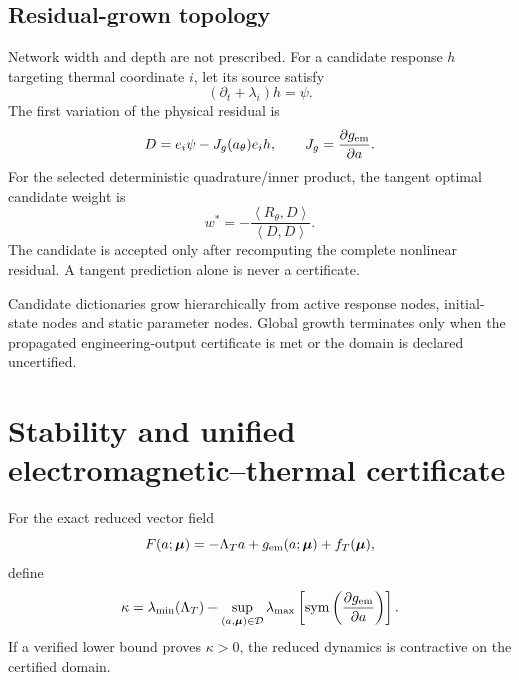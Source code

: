\documentclass[11pt]{article}
\theoremstyle{remark}
\newcommand{\mupar}{\boldsymbol\mu}
\newcommand{\ip}[2]{\left\langle #1,#2\right\rangle}
\newcommand{\sym}{\operatorname{sym}}
\begin{document}
\subsection{Residual-grown topology}
Network width and depth are not prescribed. For a candidate response \(h\) targeting thermal coordinate \(i\), let its source satisfy
\[
(\partial_t+\lambda_i)h=\psi.
\]
The first variation of the physical residual is
\begin{equation}
D=e_i\psi-J_g(a_\theta)e_i h,
\qquad
J_g=\frac{\partial g_{\rm em}}{\partial a}.
\label{eq:candidate_direction}
\end{equation}
For the selected deterministic quadrature/inner product, the tangent optimal candidate weight is
\begin{equation}
\boxed{
w^*=-\frac{\ip{R_\theta}{D}}{\ip{D}{D}}.
}
\label{eq:candidate_weight}
\end{equation}
The candidate is accepted only after recomputing the complete nonlinear residual. A tangent prediction alone is never a certificate.

Candidate dictionaries grow hierarchically from active response nodes, initial-state nodes and static parameter nodes. Global growth terminates only when the propagated engineering-output certificate is met or the domain is declared uncertified.

\section{Stability and unified electromagnetic--thermal certificate}

For the exact reduced vector field
\[
F(a;\mupar)=-\Lambda_Ta+g_{\rm em}(a;\mupar)+f_T(\mupar),
\]
define
\begin{equation}
\kappa=
\lambda_{\min}(\Lambda_T)
-\sup_{(a,\mupar)\in\mathcal D}
\lambda_{\max}\left[\sym\left(\frac{\partial g_{\rm em}}{\partial a}\right)\right].
\label{eq:kappa}
\end{equation}
If a verified lower bound proves \(\kappa>0\), the reduced dynamics is contractive on the certified domain.
\end{document}
